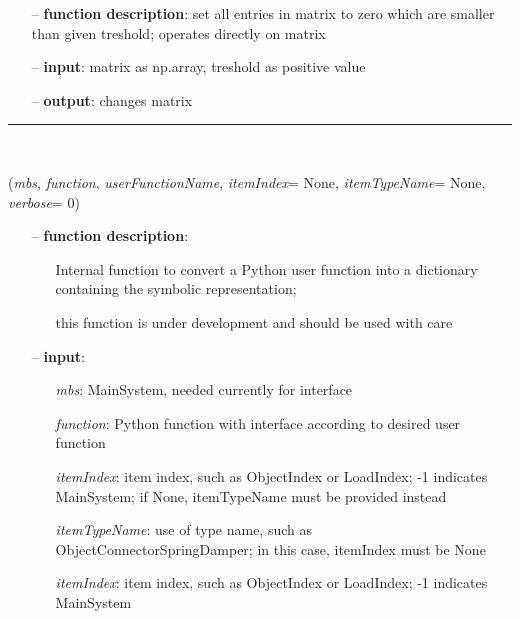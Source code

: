 \begin{itemize}[leftmargin=1.4cm]
\begin{itemize}[leftmargin=0.7cm]
\item[--]
{\bf function description}: set all entries in matrix to zero which are smaller than given treshold; operates directly on matrix
\item[--]
{\bf input}: matrix as np.array, treshold as positive value
\item[--]
{\bf output}: changes matrix
\vspace{12pt}\end{itemize}
%
\noindent\rule{8cm}{0.75pt}\vspace{1pt} \\ 
\begin{flushleft}
\label{sec:advancedUtilities:ConvertFunctionToSymbolic}
({\it mbs}, {\it function}, {\it userFunctionName}, {\it itemIndex}= None, {\it itemTypeName}= None, {\it verbose}= 0)
\end{flushleft}
\setlength{\itemindent}{0.7cm}
\begin{itemize}[leftmargin=0.7cm]
\item[--]
{\bf function description}: \vspace{-6pt}
\begin{itemize}[leftmargin=1.2cm]
\setlength{\itemindent}{-0.7cm}
\item[]Internal function to convert a Python user function into a dictionary containing the symbolic representation;
\item[]this function is under development and should be used with care
\end{itemize}
\item[--]
{\bf input}: \vspace{-6pt}
\begin{itemize}[leftmargin=1.2cm]
\setlength{\itemindent}{-0.7cm}
\item[]{\it mbs}: MainSystem, needed currently for interface
\item[]{\it function}: Python function with interface according to desired user function
\item[]{\it itemIndex}: item index, such as ObjectIndex or LoadIndex; -1 indicates MainSystem; if None, itemTypeName must be provided instead
\item[]{\it itemTypeName}: use of type name, such as ObjectConnectorSpringDamper; in this case, itemIndex must be None
\item[]{\it itemIndex}: item index, such as ObjectIndex or LoadIndex; -1 indicates MainSystem

\end{itemize}
\end{itemize}
\end{itemize}
